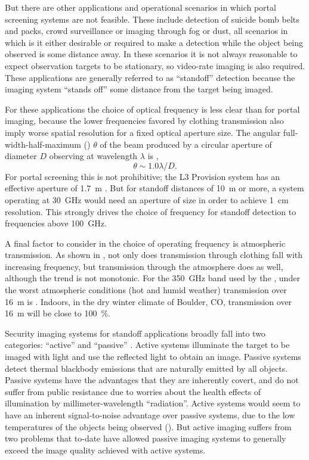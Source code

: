 But there are other applications and operational scenarios in which portal screening systems are not feasible.
These include detection of suicide bomb belts and packs, crowd surveillance or imaging through fog or dust, all scenarios in which is it either desirable or required to make a detection while the object being observed is some distance away.
In these scenarios it is not always reasonable to expect observation targets to be stationary, so video-rate imaging is also required.
These applications are generally referred to as ``standoff'' detection because the imaging system ``stands off'' some distance from the target being imaged.

For these applications the choice of optical frequency is less clear than for portal imaging, because the lower frequencies favored by clothing transmission also imply worse spatial resolution for a fixed optical aperture size.
The angular full-width-half-maximum (\FWHM) $\theta$ of the beam produced by a circular aperture of diameter $D$ observing at wavelength $\lambda$ is \cite{born_principles_1999},
\begin{equation} \label{eqn:ch1-raleigh}
  \theta \sim 1.0 \lambda / D.
\end{equation}
For portal screening this is not prohibitive; the L3 Provision system has an effective aperture of \SI{1.7}{\m} \cite{mcmakin_dual-surface_2009}.
But for standoff distances of \SI{10}{\m} or more, a system operating at \SI{30}{\GHz} would need an aperture of size  in order to achieve \SI{1}{\cm} resolution.
This strongly drives the choice of frequency for standoff detection to frequencies above \SI{100}{\GHz}.

A final factor to consider in the choice of operating frequency is atmospheric transmission.
As shown in , not only does transmission through clothing fall with increasing frequency, but transmission through the atmosphere does as well, although the trend is not monotonic.
For the \SI{350}{\GHz} band used by the \Imager, under the worst atmospheric conditions (hot and humid weather) transmission over \SI{16}{\m} is .
Indoors, in the dry winter climate of Boulder, CO, transmission over \SI{16}{\m} will be close to \SI{100}{\percent}.

Security imaging systems for standoff applications broadly fall into two categories: ``active'' and ``passive'' \cite{appleby_standoff_2007,appleby_passive_2004}.
Active systems illuminate the target to be imaged with light and use the reflected light to obtain an image.
Passive systems detect thermal blackbody emissions that are naturally emitted by all objects.
Passive systems have the advantages that they are inherently covert, and do not suffer from public resistance due to worries about the health effects of illumination by millimeter-wavelength ``radiation''.
Active systems would seem to have an inherent signal-to-noise advantage over passive systems, due to the low temperatures of the objects being observed ().
But active imaging suffers from two problems that to-date have allowed passive imaging systems to generally exceed the image quality achieved with active systems.

